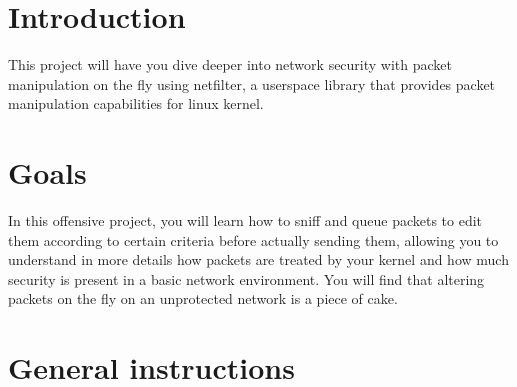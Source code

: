\documentclass{42-en}
\begin{document}
\chapter{Introduction}

    This project will have you dive deeper into network security with packet manipulation on the fly using netfilter, a userspace library that provides packet manipulation capabilities for linux kernel.


\chapter{Goals}

    In this offensive project,
    you will learn how to sniff and queue packets to edit them according to certain criteria before actually sending them,
    allowing you to understand in more details how packets are treated by your kernel and how much security is present in a basic network environment.
    You will find that altering packets on the fly on an unprotected network is a piece of cake.

   \newpage
\chapter{General instructions}
\end{document}
